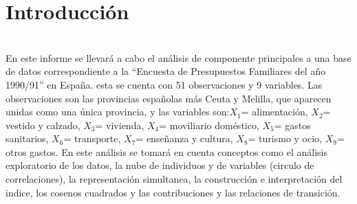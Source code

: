 \documentclass[report,oneside]{revcoles}
\begin{document}
\section{Introducción}
~\\En este informe se llevará a cabo el análisis de componente principales a una base de datos correspondiente a la ``Encuesta de Presupuestos Familiares del año 1990/91'' en España. esta se cuenta con 51 observaciones y 9 variables. Las observaciones son las provincias españolas más Ceuta y Melilla, que aparecen unidas como una única provincia, y las variables son:$X_1$= alimentación, $X_2$= vestido y calzado, $X_3$= vivienda, $X_4$= moviliario doméstico, $X_5$= gastos sanitarios, $X_6$= transporte, $X_7$= enseñanza y cultura, $X_8$= turismo y ocio, $X_9$= otros gastos. En este análisis se tomará en cuenta conceptos como el análisis exploratorio de los datos, la nube de individuos y de variables (circulo de correlaciones), la representación simultanea, la construcción e interpretación del indice, los cosenos cuadrados y las contribuciones y las relaciones de transición.
\end{document}
